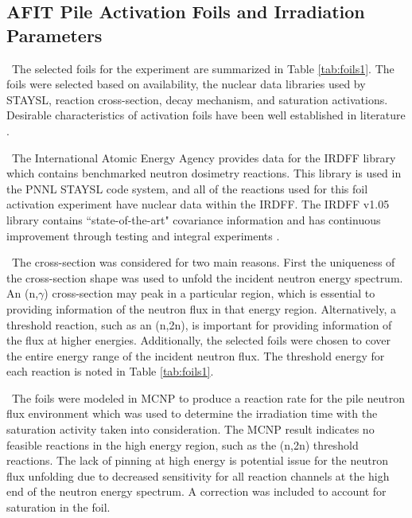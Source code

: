 \documentclass[journal]{IEEEtran}
\begin{document}
	\subsection{AFIT Pile Activation Foils and Irradiation Parameters}
	
	\ The selected foils for the experiment are summarized in Table \ref{tab:foils1}. 
	The foils were selected based on availability, the nuclear data libraries used by STAYSL, reaction cross-section, decay mechanism, and saturation activations. Desirable characteristics of activation foils have been well established in literature \cite{Knoll,Luciano2012a,Kuijpers1977}.
	
	\ The International Atomic Energy Agency provides data for the IRDFF library which contains benchmarked neutron dosimetry reactions\cite{Greenwood2016}. This library is used in the PNNL STAYSL code system, and all of the reactions used for this foil activation experiment have nuclear data within the IRDFF. The IRDFF v1.05 library contains ``state-of-the-art" covariance information and has continuous improvement through testing and integral experiments \cite{Greenwood2016}. 
	
	\ The cross-section was considered for two main reasons. First the uniqueness of the cross-section shape was used to unfold the incident neutron energy spectrum. An (n,$\gamma$) cross-section may peak in a particular region, which is essential to providing information of the neutron flux in that energy region. Alternatively, a threshold reaction, 
	such as an (n,2n), is important for providing information of the flux at higher energies. Additionally, the selected foils were chosen to cover the entire energy range of the incident neutron flux. The threshold energy for each reaction is noted in Table \ref{tab:foils1}.
	
	\ The foils were modeled in MCNP to produce a reaction rate for the pile neutron flux environment which was used to determine the irradiation time with the saturation activity taken into consideration. The MCNP result indicates no feasible reactions in the high energy region, such as the (n,2n) threshold reactions. The lack of pinning at high energy is potential issue for the neutron flux unfolding due to decreased sensitivity for all reaction channels at the high end of the neutron energy spectrum. A correction was included to account for saturation in the foil.
	
\end{document}
